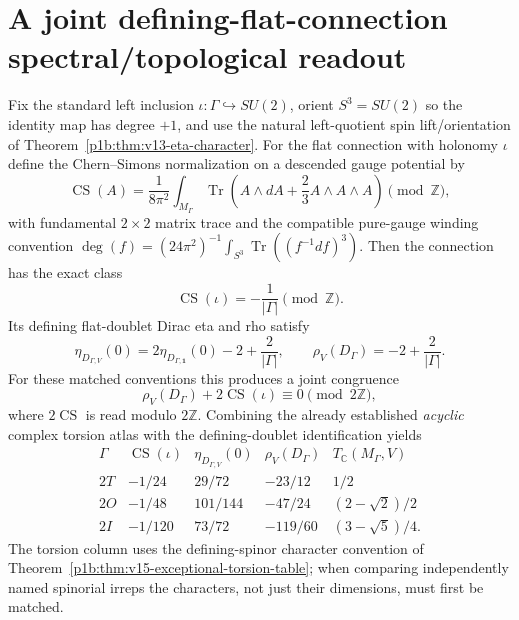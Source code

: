 \documentclass[11pt]{article}
\begin{document}
\section{A joint defining-flat-connection spectral/topological readout}
\label{p1b:sec:v16-flat-joint}
\begin{theorem}
\label{p1b:thm:v16-flat-CS-eta}
Fix the standard left inclusion $\iota:\Gamma\hookrightarrow SU(2)$,
orient $S^3=SU(2)$ so the identity map has degree $+1$, and
use the natural left-quotient spin lift/orientation of
Theorem~\ref{p1b:thm:v13-eta-character}.
For the flat connection with holonomy $\iota$ define the
Chern--Simons normalization on a descended gauge potential by
\[
\operatorname{CS}(A)=\frac1{8\pi^2}\int_{M_\Gamma}
  \operatorname{Tr}\!\left(A\wedge dA+\frac23A\wedge A\wedge A\right)
 \pmod{\mathbb Z},
\]
with fundamental $2\times2$ matrix trace and the compatible
pure-gauge winding convention
$\deg(f)=(24\pi^2)^{-1}\int_{S^3}
\operatorname{Tr}((f^{-1}df)^3)$.
Then the connection has the exact class
\begin{equation}
\boxed{\operatorname{CS}(\iota)=-\frac1{|\Gamma|}
       \pmod{\mathbb Z}.}
\tag{T16.9}\label{p1b:eq:v16-CS-inc}
\end{equation}
Its defining flat-doublet Dirac eta and rho satisfy
\begin{equation}
\boxed{\eta_{D_{\Gamma,V}}(0)
 =2\eta_{D_{\Gamma,\mathbf1}}(0)-2+\frac2{|\Gamma|},\qquad
\rho_V(D_\Gamma)=-2+\frac2{|\Gamma|}.}
\tag{T16.10}\label{p1b:eq:v16-rho-inc}
\end{equation}
For these matched conventions this produces a joint congruence
\[\boxed{\rho_V(D_\Gamma)+2\operatorname{CS}(\iota)
 \equiv0\pmod{2\mathbb Z},}
\]
where $2\operatorname{CS}$ is read modulo $2\mathbb Z$.
Combining the already established \emph{acyclic} complex torsion
atlas with the defining-doublet identification yields
\[
\begin{array}{c|c|c|c|c}
\Gamma&\operatorname{CS}(\iota)&\eta_{D_{\Gamma,V}}(0)&
\rho_V(D_\Gamma)&T_{\mathbb C}(M_\Gamma,V)\\\hline
2T&-1/24&29/72&-23/12&1/2\\
2O&-1/48&101/144&-47/24&(2-\sqrt2)/2\\
2I&-1/120&73/72&-119/60&(3-\sqrt5)/4.
\end{array}
\]
The torsion column uses the defining-spinor character convention
of Theorem~\ref{p1b:thm:v15-exceptional-torsion-table};
when comparing independently named spinorial irreps the
characters, not just their dimensions, must first be matched.
\end{theorem}
\end{document}
